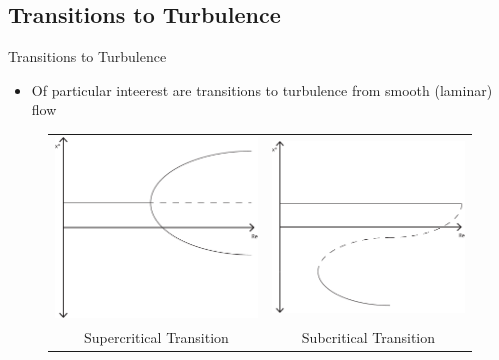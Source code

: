 \documentclass[10pt]{beamer}
\begin{document}
\subsection{Transitions to Turbulence}
\begin{frame}{Transitions to Turbulence}
\begin{itemize}
\item<1-> Of particular inteerest are transitions to turbulence from smooth (laminar) flow
\end{itemize}
\begin{figure}
\begin{tabular}{cc}
\includegraphics[scale=0.3]{Images/supercriticalTrans} & \includegraphics[scale=0.3]{Images/subcriticalTrans}\\
{\small Supercritical Transition} & {\small Subcritical Transition}
\end{tabular}
\end{figure}
\end{frame}
\end{document}
